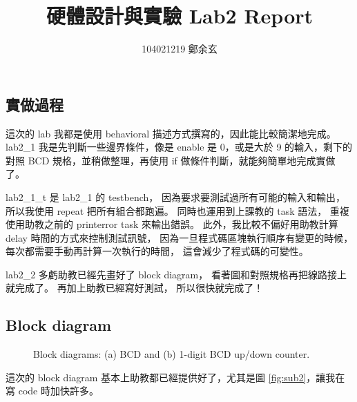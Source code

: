 \documentclass{article}
\begin{document}
\begin{CJK}{UTF8}{bsmi}
\title{硬體設計與實驗 Lab2 Report}
\author{
104021219 鄭余玄
}
\date{}
\maketitle
\section{實做過程}
這次的 lab 我都是使用 behavioral 描述方式撰寫的，因此能比較簡潔地完成。
lab2\_1 我是先判斷一些邊界條件，像是 enable 是 0，或是大於 9 的輸入，剩下的對照 BCD 規格，並稍做整理，再使用 if 做條件判斷，就能夠簡單地完成實做了。

lab2\_1\_t 是 lab2\_1 的 testbench，
因為要求要測試過所有可能的輸入和輸出，
所以我使用 repeat 把所有組合都跑遍。
同時也運用到上課教的 task 語法，
重複使用助教之前的 printerror task 來輸出錯誤。
此外，我比較不偏好用助教計算 delay 時間的方式來控制測試訊號，
因為一旦程式碼區塊執行順序有變更的時候，
每次都需要手動再計算一次執行的時間，
這會減少了程式碼的可變性。

lab2\_2 多虧助教已經先畫好了 block diagram，
看著圖和對照規格再把線路接上就完成了。
再加上助教已經寫好測試，
所以很快就完成了！

\subsection{Block diagram}
\begin{figure}[h]
\caption{Block diagrams: (a) BCD and (b) 1-digit BCD up/down counter.}
\end{figure}
這次的 block diagram 基本上助教都已經提供好了，尤其是圖 \ref{fig:sub2}，讓我在寫 code 時加快許多。

\end{CJK}
\end{document}

